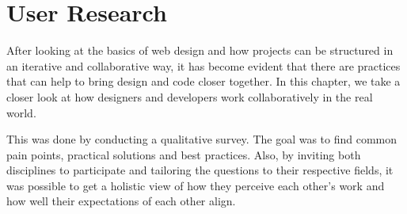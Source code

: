 \newpage
\section{User Research}
After looking at the basics of web design and how projects can be structured in an iterative and
collaborative way, it has become evident that there are practices that can help to bring design and
code closer together. In this chapter, we take a closer look at how designers and developers work
collaboratively in the real world. 

This was done by conducting a qualitative survey. The goal was to find common pain points, practical
solutions and best practices. Also, by inviting both disciplines to participate and tailoring the
questions to their respective fields, it was possible to get a holistic view of how they perceive
each other's work and how well their expectations of each other align. 


